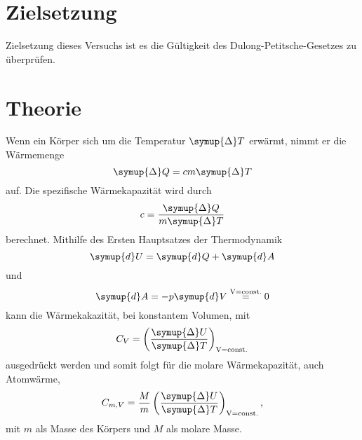 \section{Zielsetzung}
Zielsetzung dieses Versuchs ist es die Gültigkeit des Dulong-Petitsche-Gesetzes zu überprüfen.
\section{Theorie}
\label{sec:Theorie}
Wenn ein Körper sich um die Temperatur $\symup{\Delta} T$ erwärmt, nimmt er die Wärmemenge
\begin{equation}
\symup{\Delta} Q = cm \symup{\Delta} T
\end{equation}
auf.
Die spezifische Wärmekapazität wird durch
\begin{equation}
c = \frac{\symup{\Delta} Q}{m\symup{\Delta}T}
\end{equation}
berechnet.
Mithilfe des Ersten Hauptsatzes der Thermodynamik
\begin{equation}
    \symup{d}U = \symup{d}Q + \symup{d}A
\end{equation}
und
\begin{equation}
    \symup{d}A = -p\symup{d}V \stackrel{\text{V=const.}}{=} 0
\end{equation}
kann die Wärmekakazität, bei konstantem Volumen, mit
\begin{equation}
    C_V = \left(\frac{\symup{\Delta}U}{\symup{\Delta}T}\right)_\text{V=const.}
\end{equation}
ausgedrückt werden und somit folgt für die molare Wärmekapazität, auch Atomwärme,
\begin{equation}
    \label{eq:molkap}
    C_{m,V} = \frac{M}{m}\left(\frac{\symup{\Delta}U}{\symup{\Delta}T}\right)_\text{V=const.},
\end{equation}
mit $m$ als Masse des Körpers und $M$ als molare Masse.
